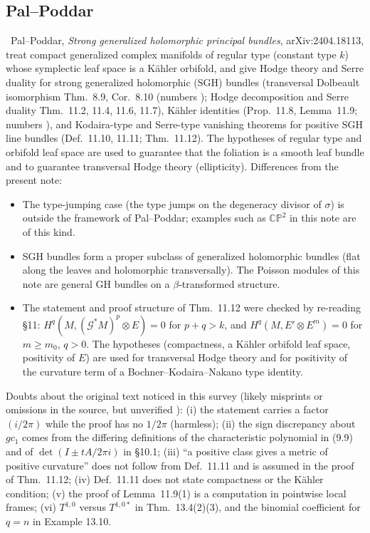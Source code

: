 \subsection{Pal--Poddar}
\tC\ Pal--Poddar, \emph{Strong generalized holomorphic principal bundles}, arXiv:2404.18113, treat compact generalized complex manifolds of regular type (constant type $k$) whose symplectic leaf space is a K\"ahler orbifold, and give Hodge theory and Serre duality for strong generalized holomorphic (SGH) bundles (transversal Dolbeault isomorphism Thm.~8.9, Cor.~8.10 (numbers \tQ); Hodge decomposition and Serre duality Thm.~11.2, 11.4, 11.6, 11.7), K\"ahler identities (Prop.~11.8, Lemma~11.9; numbers \tQ), and Kodaira-type and Serre-type vanishing theorems for positive SGH line bundles (Def.~11.10, 11.11; Thm.~11.12). The hypotheses of regular type and orbifold leaf space are used to guarantee that the foliation is a smooth leaf bundle and to guarantee transversal Hodge theory (ellipticity). Differences from the present note:
\begin{itemize}
\item The type-jumping case (the type jumps on the degeneracy divisor of $\sigma$) is outside the framework of Pal--Poddar; examples such as $\mathbb{CP}^2$ in this note are of this kind.
\item SGH bundles form a proper subclass of generalized holomorphic bundles (flat along the leaves and holomorphic transversally). The Poisson modules of this note are general GH bundles on a $\beta$-transformed structure.
\item The statement and proof structure of Thm.~11.12 were checked by re-reading \S11: $H^q(M,(\mathcal G^*M)^p\otimes E)=0$ for $p+q>k$, and $H^q(M,E'\otimes E^m)=0$ for $m\ge m_0$, $q>0$. The hypotheses (compactness, a K\"ahler orbifold leaf space, positivity of $E$) are used for transversal Hodge theory and for positivity of the curvature term of a Bochner--Kodaira--Nakano type identity.
\end{itemize}
Doubts about the original text noticed in this survey (likely misprints or omissions in the source, but unverified \tQ): (i) the statement carries a factor $(i/2\pi)$ while the proof has no $1/2\pi$ (harmless); (ii) the sign discrepancy about $gc_1$ comes from the differing definitions of the characteristic polynomial in (9.9) and of $\det(I\pm tA/2\pi i)$ in \S10.1; (iii) ``a positive class gives a metric of positive curvature'' does not follow from Def.~11.11 and is assumed in the proof of Thm.~11.12; (iv) Def.~11.11 does not state compactness or the K\"ahler condition; (v) the proof of Lemma~11.9(1) is a computation in pointwise local frames; (vi) $T^{1,0}$ versus $T^{1,0*}$ in Thm.~13.4(2)(3), and the binomial coefficient for $q=n$ in Example 13.10.

